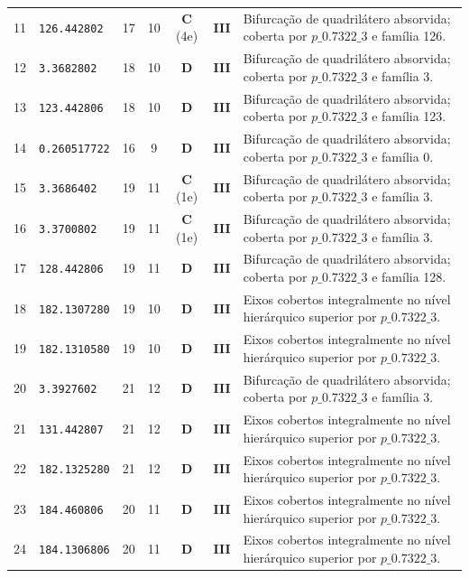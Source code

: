 \documentclass[11pt,a4paper]{article}
\begin{document}
\begin{small}
\begin{longtable}{r l c c c c p{8.8cm}}
11 & \texttt{126.442802} & 17 & 10 & \textbf{C} (4e) & \textbf{III} & Bifurcação de quadrilátero absorvida; coberta por $p\_0.7322\_3$ e família 126. \\
12 & \texttt{3.3682802} & 18 & 10 & \textbf{D} & \textbf{III} & Bifurcação de quadrilátero absorvida; coberta por $p\_0.7322\_3$ e família 3. \\
13 & \texttt{123.442806} & 18 & 10 & \textbf{D} & \textbf{III} & Bifurcação de quadrilátero absorvida; coberta por $p\_0.7322\_3$ e família 123. \\
14 & \texttt{0.260517722} & 16 & 9 & \textbf{D} & \textbf{III} & Bifurcação de quadrilátero absorvida; coberta por $p\_0.7322\_3$ e família 0. \\
15 & \texttt{3.3686402} & 19 & 11 & \textbf{C} (1e) & \textbf{III} & Bifurcação de quadrilátero absorvida; coberta por $p\_0.7322\_3$ e família 3. \\
16 & \texttt{3.3700802} & 19 & 11 & \textbf{C} (1e) & \textbf{III} & Bifurcação de quadrilátero absorvida; coberta por $p\_0.7322\_3$ e família 3. \\
17 & \texttt{128.442806} & 19 & 11 & \textbf{D} & \textbf{III} & Bifurcação de quadrilátero absorvida; coberta por $p\_0.7322\_3$ e família 128. \\
18 & \texttt{182.1307280} & 19 & 10 & \textbf{D} & \textbf{III} & Eixos cobertos integralmente no nível hierárquico superior por $p\_0.7322\_3$. \\
19 & \texttt{182.1310580} & 19 & 10 & \textbf{D} & \textbf{III} & Eixos cobertos integralmente no nível hierárquico superior por $p\_0.7322\_3$. \\
20 & \texttt{3.3927602} & 21 & 12 & \textbf{D} & \textbf{III} & Bifurcação de quadrilátero absorvida; coberta por $p\_0.7322\_3$ e família 3. \\
21 & \texttt{131.442807} & 21 & 12 & \textbf{D} & \textbf{III} & Eixos cobertos integralmente no nível hierárquico superior por $p\_0.7322\_3$. \\
22 & \texttt{182.1325280} & 21 & 12 & \textbf{D} & \textbf{III} & Eixos cobertos integralmente no nível hierárquico superior por $p\_0.7322\_3$. \\
23 & \texttt{184.460806} & 20 & 11 & \textbf{D} & \textbf{III} & Eixos cobertos integralmente no nível hierárquico superior por $p\_0.7322\_3$. \\
24 & \texttt{184.1306806} & 20 & 11 & \textbf{D} & \textbf{III} & Eixos cobertos integralmente no nível hierárquico superior por $p\_0.7322\_3$. \\

\end{longtable}
\end{small}
\end{document}
